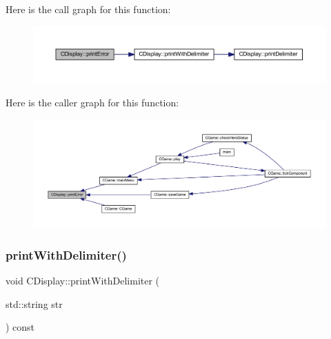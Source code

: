 Here is the call graph for this function\+:\nopagebreak
\begin{figure}[H]
\begin{center}
\leavevmode
\includegraphics[width=350pt]{class_c_display_a63f3c4f78cef1d3b13290970da9e3e85_cgraph}
\end{center}
\end{figure}
Here is the caller graph for this function\+:\nopagebreak
\begin{figure}[H]
\begin{center}
\leavevmode
\includegraphics[width=350pt]{class_c_display_a63f3c4f78cef1d3b13290970da9e3e85_icgraph}
\end{center}
\end{figure}
\mbox{\label{class_c_display_a53b65673a9b0bfc807a3a1e448962928}} 
\subsubsection{\texorpdfstring{print\+With\+Delimiter()}{printWithDelimiter()}}
{\footnotesize\ttfamily void C\+Display\+::print\+With\+Delimiter (\begin{DoxyParamCaption}\item[{std\+::string}]{str }\end{DoxyParamCaption}) const}


